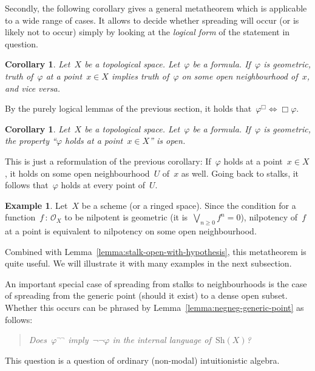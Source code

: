 \documentclass[10pt,reqno,a4paper]{amsbook}
\makeatletter
\theoremstyle{definition}
\newtheorem{ex}[defn]{Example}
\theoremstyle{plain}
\newtheorem{cor}[defn]{Corollary}
\theoremstyle{remark}
\renewcommand{\O}{\mathcal{O}}
\newcommand{\Sh}{\mathrm{Sh}}
\newcommand{\?}{\,{:}\,}
\renewcommand{\_}{\mathpunct{.}\,}
\renewenvironment{proof}[1][\proofname]{\par
  \pushQED{\qed}%
  \normalfont \topsep6\p@\@plus6\p@\relax
  \trivlist
  \item[\hskip\labelsep
        \itshape
    #1\@addpunct{.}]\ignorespaces
}{%
  \popQED\endtrivlist\@endpefalse
}
\makeatother
\begin{document}
Secondly, the following corollary gives a general metatheorem which is
applicable to a wide range of cases. It allows to decide whether spreading will
occur (or is likely not to occur) simply by looking at the \emph{logical form}
of the statement in question.

\begin{cor}\label{cor:geometric-spreading}
Let~$X$ be a topological space. Let~$\varphi$ be a formula.
If~$\varphi$ is geometric, truth of~$\varphi$ at a point~$x \in X$ implies
truth of~$\varphi$ on some open neighbourhood of~$x$, and vice versa.\end{cor}
\begin{proof}By the purely logical lemmas of the previous section, it holds
that~$\varphi^\Box \Leftrightarrow \Box\varphi$.
\end{proof}

\begin{cor}
Let~$X$ be a topological space. Let~$\varphi$ be a formula.
If~$\varphi$ is geometric, the property ``$\varphi$ holds at a point~$x \in
X$'' is open.
\end{cor}
\begin{proof}This is just a reformulation of the previous corollary:
If~$\varphi$ holds at a point~$x \in X$, it holds on some open
neighbourhood~$U$ of~$x$ as well. Going back to stalks, it follows
that~$\varphi$ holds at every point of~$U$.\end{proof}

\begin{ex}Let~$X$ be a scheme (or a ringed space). Since the condition for a
function~$f\?\O_X$ to be nilpotent is geometric (it is~$\bigvee_{n \geq 0} f^n
= 0$), nilpotency of~$f$ at a point is equivalent to nilpotency on some open
neighbourhood.\end{ex}

Combined with Lemma~\ref{lemma:stalk-open-with-hypothesis}, this metatheorem is
quite useful. We will illustrate it with many examples in the next subsection.

An important special case of spreading from stalks to neighbourhoods is the
case of spreading from the generic point (should it exist) to a dense open
subset. Whether this occurs can be phrased by
Lemma~\ref{lemma:negneg-generic-point} as follows:
\begin{quote}
\emph{Does~$\varphi^{\neg\neg}$ imply~$\neg\neg\varphi$ in the internal language
of~$\Sh(X)$?}
\end{quote}
This question is a question of ordinary (non-modal) intuitionistic algebra.
\end{document}
